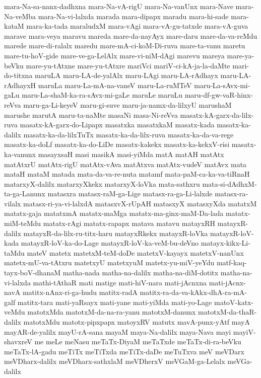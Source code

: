 {mara-Na-sa-nanx-dadhxna
mara-Na-vA-rigU
mara-Na-vanUnx
mara-Nave
mara-Na-veMba
mara-Na-vi-lalxda
marada
mara-dipapx
maradu
mara-hi-sade
mara-kataM
mara-ka-tada
maraludxM
mara-vAgi
mara-vA-gu-tatxde
mara-vA-guva
marave
mara-veya
maravu
mareda
mare-da-nayAyx
mare-daru
mare-da-va-reMdu
marede
mare-di-ralalx
maredu
mare-mA-ci-koM-Di-ruva
mare-ta-vanu
maretu
mare-tu-hoV-gide
mare-ve-ga-LelAlx
mare-vi-niM-dAgi
marevu
mareya
mare-ya-beVku
mare-yu-tAtxne
mare-yu-tAtxre
mariVci
mariV-ci-kA-ja-la-daMte
mari-do-titxna
maruLA
maru-LA-de-yalAlx
maru-LAgi
maru-LA-rAdhayx
maru-LA-rAdhayxH
maruLa
maru-La-mA-na-vaneV
maru-La-ruMTeV
maru-La-sAvx-mi-gaLu
maru-La-shaM-ka-ra-sAvx-mi-gaLe
maruLe
maruLu
maru-df-gw-vaR-hinx-reVva
maru-ga-Li-keyeV
maru-gi-suve
maru-ja-namx-da-lilxyU
marushaM
marushe
marutA
maru-ta-naMte
masaNi
masa-Ni-reVva
masatx-kA-garx-da-lilx-ruva
masatx-kA-garx-do-Lipapx
masatxka
masatxkaM
masatx-kada
masatx-ka-dalilx
masatx-ka-da-lilxTuTx
masatx-ka-da-lilx-ruva
masatx-ka-da-va-rege
masatx-ka-doLf
masatx-ka-do-LiDe
masatx-kakekx
masatx-ka-kekxV-risi
masatx-ka-vanunx
masayxsaH
masi
masikA
masi-yiMda
matA
matAH
matAtx
matAtxrU
matAtx-rigU
matAtx-vAva
matAtxva
matAtx-vudeV
matAvx
mata
mataH
mataM
matada
mata-da-va-re-nuta
matamf
mata-paM-ca-ka-va-tiRnaH
matarxyX-dalilx
matarxyXkekx
matarxyX-loVka
mata-sathxru
mata-si-dAdhxM-ta-ga-Lanunx
matasxra
matasx-raM-ga-Lige
matasx-ra-ga-Li-lalxde
matasx-ra-vilalx
matasx-ri-ya-vi-lalxdA
matasxvX-rUpAH
matasxyX
matasxyXda
matatxM
matatx-gaja
matatxmA
matatx-maMga
matatx-ma-ginx-maM-Da-lada
matatx-miM-teMdu
matatx-rAgi
matatx-rapapx
matava
matavu
matayxRH
matayxR-dalilx
matayxR-da-lilx-ru-titx-haru
matayxRkekx
matayxR-loVka
matayxR-loV-kada
matayxR-loV-ka-do-Lage
matayxR-loV-ka-veM-bu-deVno
matayx-kikx-Li-taMdu
mateV
matetx
matetxM-teM-doDe
matetxV-kayayx
matetxV-nanUnx
matetx-mU-va-tAtxru
matetxyU
matetxyuM
matetx-yu-miV-yeYdu
matf-kaq-tayx-boV-dhanaM
matha-nada
matha-na-dalilx
matha-na-diM-dotitx
matha-na-vi-lalxda
mathi-tAthaR
mati
matige
mati-hiV-nara
mati-jAcnxna
mati-jAcnx-navA
matitx-nAnx-ri-ga-hudu
matitx-radA
matitx-ra-da-va-kAkx-dhA-ra-mA-galf
matitx-tara
mati-yaRsayx
mati-yane
mati-yiMda
mati-yo-Lage
matoV-katx-veMdu
matotxMda
matotxM-da-na-ra-yanu
matotxM-danunx
matotxM-da-thaR-dalilx
matotxMdu
matotx-pipxpapx
matoyxRV
matutx
mavA-punx-yAtf
mayA
mayAR-de-yalilx
mayU-rA-sana
mayaM
maya-Na-dalilx
maya-Nava
mayi
mayiV-shavxreV
me
meLe
meNasu
meTaTx-DiyaM
meTaTxde
meTaTx-di-ra-beVku
meTaTx-lA-gadu
meTiTx
meTiTxda
meTiTx-daDe
meTuTxva
meV
meVDarx
meVDharx-dalilx
meVDharx-sathxlaM
meVDherxV
meVGaM-ga-Lelalx
meVGa-dalilx
}

